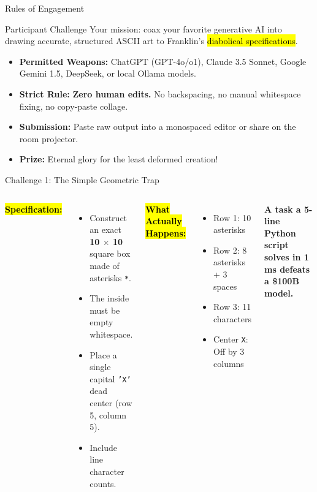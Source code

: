 \documentclass[12pt]{beamer}
\begin{document}
\begin{frame}{Rules of Engagement}
  \begin{block}{Participant Challenge}
    Your mission: coax your favorite generative AI into drawing accurate, structured ASCII art to Franklin's \hl{diabolical specifications}.
  \end{block}

  \vspace{0.2cm}
  \begin{itemize}
    \item \textbf{Permitted Weapons:} ChatGPT (GPT-4o/o1), Claude 3.5 Sonnet, Google Gemini 1.5, DeepSeek, or local Ollama models.
    \item \textbf{Strict Rule:} \textbf{Zero human edits.} No backspacing, no manual whitespace fixing, no copy-paste collage.
    \item \textbf{Submission:} Paste raw output into a monospaced editor or share on the room projector.
    \item \textbf{Prize:} Eternal glory for the least deformed creation!
  \end{itemize}
\end{frame}

\begin{frame}{Challenge 1: The Simple Geometric Trap}
  \begin{columns}[T]
      \textbf{\hl{Specification:}}
      \begin{itemize}
        \item Construct an exact \textbf{10 $\times$ 10} square box made of asterisks \texttt{*}.
        \item The inside must be empty whitespace.
        \item Place a single capital \texttt{'X'} dead center (row 5, column 5).
        \item Include line character counts.
      \end{itemize}

      \textbf{\hl{What Actually Happens:}}
      \begin{itemize}
        \item Row 1: 10 asterisks
        \item Row 2: 8 asterisks + 3 spaces
        \item Row 3: 11 characters
        \item Center \texttt{X}: Off by 3 columns
      \end{itemize}
      \vspace{0.2cm}
      \centering
      \small\textcolor{accent1}{\textbf{A task a 5-line Python script solves in 1 ms defeats a \$100B model.}}
  \end{columns}
\end{frame}
\end{document}
